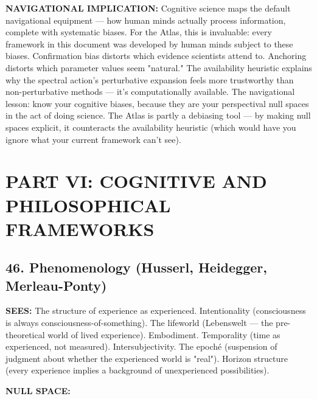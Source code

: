 \textbf{NAVIGATIONAL IMPLICATION:} Cognitive science maps the default navigational equipment — how human minds actually process information, complete with systematic biases. For the Atlas, this is invaluable: every framework in this document was developed by human minds subject to these biases. Confirmation bias distorts which evidence scientists attend to. Anchoring distorts which parameter values seem "natural." The availability heuristic explains why the spectral action's perturbative expansion feels more trustworthy than non-perturbative methods — it's computationally available. The navigational lesson: know your cognitive biases, because they are your perspectival null spaces in the act of doing science. The Atlas is partly a debiasing tool — by making null spaces explicit, it counteracts the availability heuristic (which would have you ignore what your current framework can't see).


\bigskip\noindent\makebox[\textwidth]{\color{rulegray}\rule{5cm}{0.3pt}}\bigskip


\chapter*{PART VI: COGNITIVE AND PHILOSOPHICAL FRAMEWORKS}


\section*{46. Phenomenology (Husserl, Heidegger, Merleau-Ponty)}


\textbf{SEES:} The structure of experience as experienced. Intentionality (consciousness is always consciousness-of-something). The lifeworld (Lebenswelt — the pre-theoretical world of lived experience). Embodiment. Temporality (time as experienced, not measured). Intersubjectivity. The epoché (suspension of judgment about whether the experienced world is "real"). Horizon structure (every experience implies a background of unexperienced possibilities).


\textbf{NULL SPACE:}

